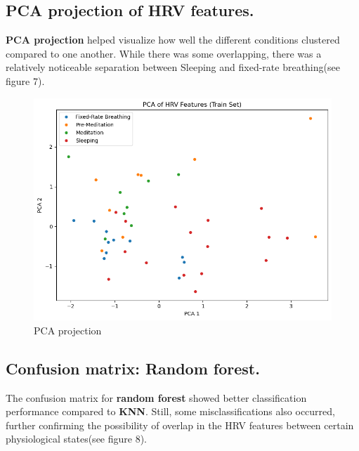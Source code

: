 \documentclass[
  11pt,
]{ieee}
\begin{document}
\subsection{PCA projection of HRV
features.}\label{pca-projection-of-hrv-features.}

\vspace{0.8em}

\textbf{PCA projection} helped visualize how well the different
conditions clustered compared to one another. While there was some
overlapping, there was a relatively noticeable separation between
Sleeping and fixed-rate breathing(see figure 7).

\begin{figure}

{\centering \includegraphics{picture_use_ml/7_PCA Projection of HRV Features.png}

}

\caption{PCA projection}

\end{figure}%

\subsection{Confusion matrix: Random
forest.}\label{confusion-matrix-random-forest.}

\vspace{0.8em}

The confusion matrix for \textbf{random forest} showed better
classification performance compared to \textbf{KNN}. Still, some
misclassifications also occurred, further confirming the possibility of
overlap in the HRV features between certain physiological states(see
figure 8).
\end{document}
